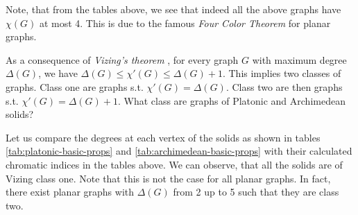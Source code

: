 Note, that from the tables above, we see that indeed all the above graphs have $\chi(G)$ at most 4. This is due to the famous \textit{Four Color Theorem} \cite{appelhaken76} for planar graphs.

\begin{highlight}

As a consequence of \textit{Vizing's theorem} \cite{misra92}, for every graph $G$ with maximum degree $\Delta(G)$, we have $\Delta(G) \leq \chi'(G) \leq \Delta(G) + 1$. This implies two classes of graphs. Class one are graphs s.t. $\chi'(G) = \Delta(G)$. Class two are then graphs s.t. $\chi'(G) = \Delta(G) + 1$. What class are graphs of Platonic and Archimedean solids?

Let us compare the degrees at each vertex of the solids as shown in tables \ref{tab:platonic-basic-props} and \ref{tab:archimedean-basic-props} with their calculated chromatic indices in the tables above. We can observe, that all the solids are of Vizing class one. Note that this is not the case for all planar graphs. In fact, there exist planar graphs with $\Delta(G)$ from 2 up to 5 such that they are class two.

\end{highlight}


